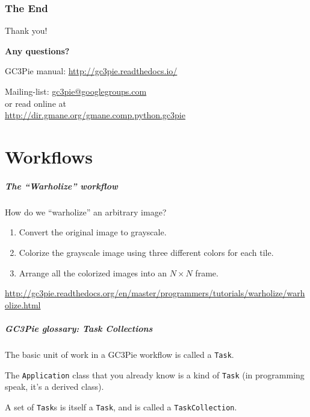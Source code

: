 \documentclass[english,serif,mathserif,usenames,dvipsnames]{beamer}
\begin{document}


\section{The End}

\begin{frame}[fragile]
  \begin{center}
    Thank you!

    \+
    {\Huge \textbf{Any questions?}}

    \+\+
    GC3Pie manual: \url{http://gc3pie.readthedocs.io/}

    \+\+
    Mailing-list: \url{gc3pie@googlegroups.com} \\
    or read online at \\
    \url{http://dir.gmane.org/gmane.comp.python.gc3pie}
  \end{center}
\end{frame}


\part{Workflows}

\begin{frame}[label=workflows]
  \frametitle{The ``Warholize'' workflow}
How do we ``warholize'' an arbitrary image?

\+
\begin{enumerate}
\item Convert the original image to grayscale.
\item Colorize the grayscale image using three different colors for each tile.
\item Arrange all the colorized images into an $N\times N$ frame.
\end{enumerate}

\+
\begin{references}
  \url{http://gc3pie.readthedocs.org/en/master/programmers/tutorials/warholize/warholize.html}
\end{references}
\end{frame}


\begin{frame}
  \frametitle{GC3Pie glossary: Task Collections}

  The basic unit of work in a GC3Pie workflow is called a \texttt{Task}.

  \+
  The \texttt{Application} class that you already know is a kind of
  \texttt{Task} (in programming speak, it's a derived class).

  \+
  A set of \texttt{Task}s is itself a \texttt{Task}, and is called a \texttt{TaskCollection}.
\end{frame}
\end{document}
